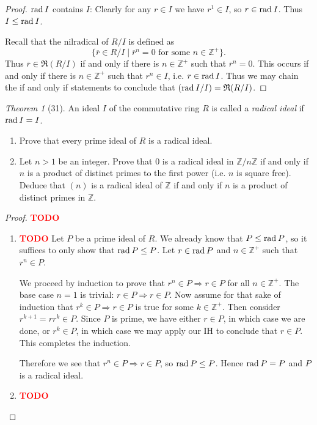 \documentclass[12pt]{article}
\theoremstyle{remark}
\theoremstyle{named}
\newtheorem*{theorem}{Theorem}
\newcommand{\todo}{\textcolor{red}{\textbf{TODO} }}
\newcommand{\Z}{\mathbb Z}
\newcommand{\rad}{\text{rad}\hspace*{0.7mm}}
\begin{document}
\begin{proof}
    \(\rad I\) contains \(I\): Clearly for any \(r \in I\) we have \(r^1 \in I\), so \(r \in \rad I\). Thus \(I \le \rad I\).

    Recall that the nilradical of \(R / I\) is defined as
    \[\{\overline{r} \in R / I \mid \overline{r}^n = 0 \text{ for some } n \in \Z^+\}.\]
    Thus \(\overline{r} \in \mathfrak{R}(R / I)\) if and only if there is \(n \in \Z^+\) such that \(\overline{r}^n = 0\). This occurs if and only if there is \(n \in \Z^+\) such that \(r^n \in I\), i.e. \(r \in \rad I\). Thus we may chain the if and only if statements to conclude that \((\rad I / I) = \mathfrak{R}(R / I)\).
\end{proof}

\begin{theorem}[31]
    An ideal \(I\) of the commutative ring \(R\) is called a \textit{radical ideal} if \(\rad I = I\). 
    \begin{enumerate}
        \item Prove that every prime ideal of \(R\) is a radical ideal.
        \item Let \(n > 1\) be an integer. Prove that 0 is a radical ideal in \(\Z / n \Z\) if and only if \(n\) is a product of distinct primes to the first power (i.e. \(n\) is square free). Deduce that \((n)\) is a radical ideal of \(\Z\) if and only if \(n\) is a product of distinct primes in \(\Z\). 
    \end{enumerate}
\end{theorem}

\begin{proof}
    \todo
    \begin{enumerate}
        \item \todo Let \(P\) be a prime ideal of \(R\). We already know that \(P \le \rad P\), so it suffices to only show that \(\rad P \le P\). Let \(r \in \rad P\) and \(n \in \Z^+\) such that \(r^n \in P\). 
        
        We proceed by induction to prove that \(r^n \in P \Rightarrow r \in P\) for all \(n \in \Z^+\). The base case \(n = 1\) is trivial: \(r \in P \Rightarrow r \in P\). Now assume for that sake of induction that \(r^k \in P \Rightarrow r \in P\) is true for some \(k \in \Z^+\). Then consider \(r^{k + 1} = rr^k\in P\). Since \(P\) is prime, we have either \(r \in P\), in which case we are done, or \(r^k \in P\), in which case we may apply our IH to conclude that \(r \in P\). This completes the induction. 

        Therefore we see that \(r^n \in P \Rightarrow r \in P\), so \(\rad P \le P\). Hence \(\rad P = P\) and \(P\) is a radical ideal.
        \item \todo 
    \end{enumerate}
\end{proof}
\end{document}
